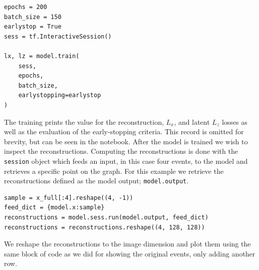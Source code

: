 \begin{minipage}{\linewidth}
\begin{lstlisting}[language=iPython]
epochs = 200
batch_size = 150
earlystop = True
sess = tf.InteractiveSession()

lx, lz = model.train(
    sess,
    epochs,
    batch_size,
    earlystopping=earlystop
)
\end{lstlisting}
\end{minipage}

\noindent The training prints the value for the reconstruction, $L_x$, and latent $L_z$ losses as well as the evaluation of the early-stopping criteria. This record is omitted for brevity, but can be seen in the notebook. After the model is trained we wish to inspect the reconstructions. Computing the reconstructions is done with the \lstinline{session} object which feeds an input, in this case four events, to the model and retrieves a specific point on the graph. For this example we retrieve the reconstructions defined as the model output; \lstinline{model.output}.

\begin{minipage}{\linewidth}
\begin{lstlisting}[language=iPython]
sample = x_full[:4].reshape((4, -1))
feed_dict = {model.x:sample}
reconstructions = model.sess.run(model.output, feed_dict)
reconstructions = reconstructions.reshape((4, 128, 128))
\end{lstlisting}
\end{minipage}

\noindent We reshape the reconstructions to the image dimension and plot them using the same block of code as we did for showing the original events, only adding another row. 

